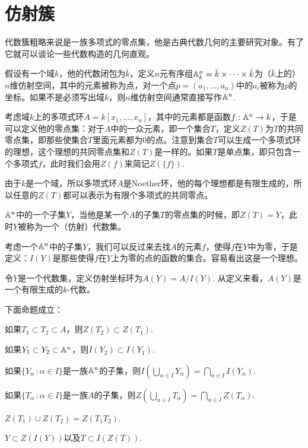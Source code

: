 \section{仿射簇}
\label{variety}

代数簇粗略来说是一族多项式的零点集，他是古典代数几何的主要研究对象。有了它就可以谈论一些代数构造的几何直观。

\para 假设有一个域$k$，他的代数闭包为$\bar{k}$，定义$n$元有序组$\mathbb{A}^n_k=\bar{k}\times \cdots \times \bar{k}$为（$\bar{k}$上的）$n$维仿射空间，其中的元素被称为点，对一个点$p=(a_1,\dots ,a_n)$中的$a_i$被称为$p$的坐标。如果不是必须写出域$k$，则$n$维仿射空间通常直接写作$\mathbb{A}^n$.

考虑域$k$上的多项式环$A=k[x_1,\dots ,x_n]$，其中的元素都是函数$f:\mathbb{A}^n\to k$，于是可以定义他的零点集：对于$A$中的一众元素，即一个集合$T$，定义$Z(T)$为$T$的共同零点集，即那些使集合$T$里面元素都为$0$的点。注意到集合$T$可以生成一个多项式环的理想，这个理想的共同零点集和$Z(T)$是一样的。如果$T$是单点集，即只包含一个多项式$f$，此时我们会用$Z(f)$来简记$Z(\{f\})$.

由于$k$是一个域，所以多项式环$A$是Noether环，他的每个理想都是有限生成的，所以任意的$Z(T)$都可以表示为有限个多项式的共同零点。

\para $\mathbb{A}^n$中的一个子集$Y$，当他是某一个$A$的子集$T$的零点集的时候，即$Z(T)=Y$，此时$Y$被称为一个（仿射）代数集。

考虑一个$\mathbb{A}^n$中的子集$Y$，我们可以反过来去找$A$的元素$f$，使得$f$在$Y$中为零，于是定义：$I(Y)$是那些使得$f$在$Y$上为零的点的函数的集合。容易看出这是一个理想。

\para 令$Y$是一个代数集，定义仿射坐标环为$A(Y)=A/I(Y)$. 从定义来看，$A(Y)$是一个有限生成的$k$-代数。

\begin{pro}下面命题成立：
    \begin{compactenum}[~~~(1)]
        \item 如果$T_1\subset T_2 \subset A$，则$Z(T_2)\subset Z(T_1)$.
        \item 如果$Y_1\subset Y_2 \subset \mathbb{A}^n$，则$I(Y_2)\subset I(Y_1)$.
        \item 如果$\{Y_\alpha\,:\alpha\in I\}$是一族$\mathbb{A}^n$的子集，则$I\left(\bigcup_{\alpha\in I} Y_\alpha\right)=\bigcap_{\alpha\in I} I(Y_\alpha)$.
        \item 如果$\{T_\alpha\,:\alpha\in I\}$是一族$A$的子集，则$Z\left(\bigcup_{\alpha\in I} T_\alpha\right)=\bigcap_{\alpha\in I} Z(T_\alpha)$.
        \item $Z(T_1)\cup Z(T_2)=Z(T_1T_2)$.
        \item $Y\subset Z(I(Y))$以及$T\subset I(Z(T))$.
    \end{compactenum}
\end{pro}

